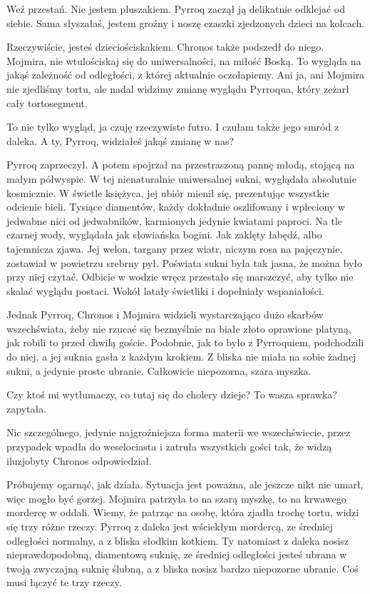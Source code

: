 \ds{} Weź przestań. Nie jestem pluszakiem. \dm{} Pyrroq zaczął ją delikatnie odklejać od siebie. \dm{}
Sama słyszałaś, jestem groźny i noszę czaszki zjedzonych dzieci na kolcach. \de{}

\ds{} Rzeczywiście, jesteś dzieciościskakiem. \dm{} Chronos także podszedł do niego. \dm{} Mojmira, nie wtulościskaj się do uniwersalności, na miłość Boską.
To wygląda na jakąś zależność od odległości, z której aktualnie oczołapiemy. Ani ja, ani Mojmira nie zjedliśmy tortu, ale nadal widzimy zmianę wyglądu Pyrroqua, który zeżarł cały tortosegment. \de{}

\ds{} To nie tylko wygląd, ja czuję rzeczywiste futro. I czułam także jego smród z daleka. A ty, Pyrroq, widziałeś jakąś zmianę w nas? \de{}

Pyrroq zaprzeczył. A potem spojrzał na przestraszoną pannę młodą, stojącą na małym półwyspie.
W tej nienaturalnie uniwersalnej sukni, wyglądała absolutnie kosmicznie.
W świetle księżyca, jej ubiór mienił się, prezentując wszystkie odcienie bieli.
Tysiące diamentów, każdy dokładnie oszlifowany i wpleciony w jedwabne nici od jedwabników, karmionych jedynie kwiatami paproci.
Na tle czarnej wody, wyglądała jak słowiańska bogini. Jak zaklęty łabędź, albo tajemnicza zjawa.
Jej welon, targany przez wiatr, niczym rosa na pajęczynie, zostawiał w powietrzu srebrny pył.
Poświata sukni była tak jasna, że można było przy niej czytać.
Odbicie w wodzie wręcz przestało się marszczyć, aby tylko nie skalać wyglądu postaci.
Wokół latały świetliki i dopełniały wspaniałości.

Jednak Pyrroq, Chronos i Mojmira widzieli wystarczająco dużo skarbów wszechświata, żeby nie rzucać się bezmyślnie na białe złoto oprawione platyną, 
jak robili to przed chwilą goście.
Podobnie, jak to było z Pyrroquiem, podchodzili do niej, a jej suknia gasła z każdym krokiem.
Z bliska nie miała na sobie żadnej sukni, a jedynie proste ubranie. Całkowicie niepozorna, szara myszka.

\ds{} Czy ktoś mi wytłumaczy, co tutaj się do cholery dzieje? To wasza sprawka? \dm{} zapytała. \de{}

\ds{} Nic szczególnego, jedynie najgroźniejsza forma materii we wszechświecie, przez przypadek wpadła do weselociasta i zatruła wszystkich gości tak, że widzą iluzjobyty \dm{}
Chronos odpowiedział.\de{}

\ds{} Próbujemy ogarnąć, jak działa. Sytuacja jest poważna, ale jeszcze nikt nie umarł, więc mogło być gorzej. \dm{} Mojmira patrzyła to na szarą myszkę, to na krwawego mordercę w oddali. \dm{}
Wiemy, że patrząc na osobę, która zjadła trochę tortu, widzi się trzy różne rzeczy. Pyrroq z daleka jest wściekłym mordercą, ze średniej odległości normalny, a z bliska słodkim kotkiem.
Ty natomiast z daleka nosisz nieprawdopodobną, diamentową suknię, ze średniej odległości jesteś ubrana w twoją zwyczajną suknię ślubną, a z bliska nosisz bardzo niepozorne ubranie.
Coś musi łączyć te trzy rzeczy. \de{}

